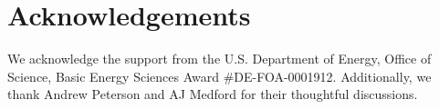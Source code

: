 \documentclass[%
 reprint,
 amsmath,amssymb,
 aps,
]{revtex4-2}
\begin{document}
\section{Acknowledgements}

We acknowledge the support from the U.S. Department of Energy, Office of Science, Basic Energy Sciences Award \#{}DE-FOA-0001912. Additionally, we thank Andrew Peterson and AJ Medford for their thoughtful discussions.

\clearpage
\end{document}
